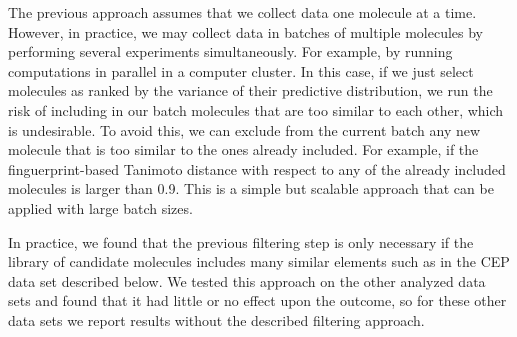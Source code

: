 The previous approach assumes that we collect data one molecule at a time. However, in practice, we may
collect data in batches of multiple molecules by performing several experiments simultaneously. For example, by running computations in parallel in a computer cluster. In this case, if we just select molecules as ranked by the variance of their predictive distribution, we run the risk of including in our batch molecules that are too similar to each other, which is undesirable. To avoid this, we can exclude from the current batch any new molecule that is too similar to the ones already included. For example, if the finguerprint-based Tanimoto distance with respect to any of the already included molecules is larger than 0.9. This is a simple but scalable approach that can be applied with large batch sizes. 

In practice, we found that the previous filtering step is only necessary if the library of candidate molecules includes many similar elements such as in the CEP data set described below. We tested this approach on the other analyzed data sets and found that it had little or no effect upon the outcome, so for these other data sets we report results without the described filtering approach.